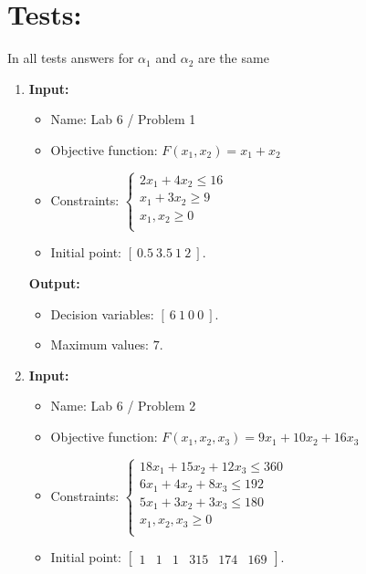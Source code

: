 \documentclass{article}
\begin{document}
\newpage

\section*{Tests:}

In all tests answers for \(\alpha_1\) and \(\alpha_2\) are the same

\begin{enumerate}[label={(\arabic*)}, itemsep=0.25in]
    \item \textbf{Input:}
          \begin{itemize}
              \item Name: Lab 6 / Problem 1
              \item Objective function: \(F(x_1, x_2) = x_1 + x_2\)
              \item Constraints: \(\begin{cases}
                        2 x_1 + 4 x_2 \le 16 \\
                        x_1 + 3 x_2 \ge 9    \\
                        x_1 , x_2 \ge 0      \\
                    \end{cases}\)
          \end{itemize}
          \begin{itemize}
              \item Initial point: \([ \ 0.5 \ 3.5 \ 1 \ 2 \ ]\).
          \end{itemize}
          \textbf{Output:}
          \begin{itemize}
              \item Decision variables: \([ \ 6 \ 1 \ 0 \ 0 \ ]\).
              \item Maximum values:  \(7\).
          \end{itemize}

    \item \textbf{Input:}
          \begin{itemize}
              \item Name: Lab 6 / Problem 2
              \item Objective function: \(F(x_1, x_2, x_3) = 9 x_1 + 10 x_2 + 16 x_3\)
              \item Constraints: \(\begin{cases}
                        18 x_1 + 15 x_2 + 12 x_3 \le 360 \\
                        6 x_1 + 4 x_2 + 8 x_3 \le 192    \\
                        5 x_1 + 3 x_2 + 3 x_3 \le 180    \\
                        x_1, x_2, x_3 \ge 0              \\
                    \end{cases}\)
          \end{itemize}
          \begin{itemize}
              \item Initial point: \(\begin{bmatrix} 1 & 1 & 1 & 315 & 174 & 169 \end{bmatrix}\).
          \end{itemize}


\end{enumerate}
\end{document}
